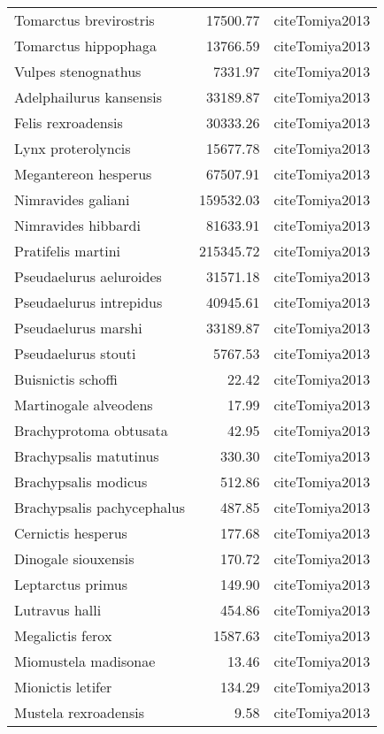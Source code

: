 \begin{table}[ht]
\begin{tabular}{lrl}
  Tomarctus brevirostris & 17500.77 & cite{Tomiya2013} \\ 
  Tomarctus hippophaga & 13766.59 & cite{Tomiya2013} \\ 
  Vulpes stenognathus & 7331.97 & cite{Tomiya2013} \\ 
  Adelphailurus kansensis & 33189.87 & cite{Tomiya2013} \\ 
  Felis rexroadensis & 30333.26 & cite{Tomiya2013} \\ 
  Lynx proterolyncis & 15677.78 & cite{Tomiya2013} \\ 
  Megantereon hesperus & 67507.91 & cite{Tomiya2013} \\ 
  Nimravides galiani & 159532.03 & cite{Tomiya2013} \\ 
  Nimravides hibbardi & 81633.91 & cite{Tomiya2013} \\ 
  Pratifelis martini & 215345.72 & cite{Tomiya2013} \\ 
  Pseudaelurus aeluroides & 31571.18 & cite{Tomiya2013} \\ 
  Pseudaelurus intrepidus & 40945.61 & cite{Tomiya2013} \\ 
  Pseudaelurus marshi & 33189.87 & cite{Tomiya2013} \\ 
  Pseudaelurus stouti & 5767.53 & cite{Tomiya2013} \\ 
  Buisnictis schoffi & 22.42 & cite{Tomiya2013} \\ 
  Martinogale alveodens & 17.99 & cite{Tomiya2013} \\ 
  Brachyprotoma obtusata & 42.95 & cite{Tomiya2013} \\ 
  Brachypsalis matutinus & 330.30 & cite{Tomiya2013} \\ 
  Brachypsalis modicus & 512.86 & cite{Tomiya2013} \\ 
  Brachypsalis pachycephalus & 487.85 & cite{Tomiya2013} \\ 
  Cernictis hesperus & 177.68 & cite{Tomiya2013} \\ 
  Dinogale siouxensis & 170.72 & cite{Tomiya2013} \\ 
  Leptarctus primus & 149.90 & cite{Tomiya2013} \\ 
  Lutravus halli & 454.86 & cite{Tomiya2013} \\ 
  Megalictis ferox & 1587.63 & cite{Tomiya2013} \\ 
  Miomustela madisonae & 13.46 & cite{Tomiya2013} \\ 
  Mionictis letifer & 134.29 & cite{Tomiya2013} \\ 
  Mustela rexroadensis & 9.58 & cite{Tomiya2013} \\ 

\end{tabular}
\end{table}
